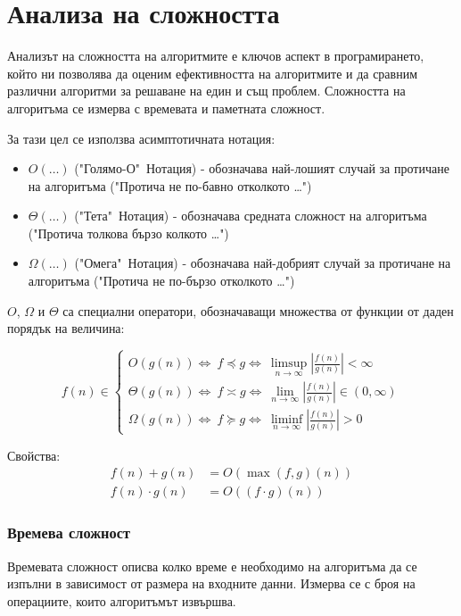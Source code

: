 \documentclass[oneside]{book}
\begin{document}
\section{Анализа на сложността}
Анализът на сложността на алгоритмите е ключов аспект в програмирането, който ни позволява да оценим ефективността на алгоритмите и да сравним различни алгоритми за решаване на един и същ проблем.
Сложността на алгоритъма се измерва с времевата и паметната сложност.

\pagebreak
За тази цел се използва асимптотичната нотация:
\begin{itemize}
    \item $O(\dots)$ ("Голямо-О"\ Нотация) - обозначава най-лошият случай за протичане на алгоритъма ("Протича не по-бавно отколкото \dots")
    \item $\Theta(\dots)$ ("Тета"\ Нотация) - обозначава средната сложност на алгоритъма ("Протича толкова бързо колкото \dots")
    \item $\Omega(\dots)$ ("Омега"\ Нотация) - обозначава най-добрият случай за протичане на алгоритъма ("Протича не по-бързо отколкото \dots")
\end{itemize}

$O$, $\Omega$ и $\Theta$ са специални оператори, обозначаващи множества от функции от даден порядък на величина:

\begin{equation*}
    f(n)\in
    \begin{cases}
        O(g(n)) \Leftrightarrow\ f \preceq g \Leftrightarrow\ \limsup_{n\to\infty} \left|\frac{f(n)}{g(n)}\right| < \infty\\
        \Theta(g(n)) \Leftrightarrow\ f \asymp g \Leftrightarrow\ \lim_{n\to\infty} \left|\frac{f(n)}{g(n)}\right| \in (0, \infty)\\
        \Omega(g(n)) \Leftrightarrow\ f \succeq g \Leftrightarrow\ \liminf_{n\to\infty} \left|\frac{f(n)}{g(n)}\right| > 0
    \end{cases}
\end{equation*}

Свойства:
\begin{align*}
    f(n) + g(n) &= O(\max(f,g)(n))\\
    f(n) \cdot g(n) &= O((f \cdot g)(n))
\end{align*}

\subsubsection{Времева сложност}
Времевата сложност описва колко време е необходимо на алгоритъма да се изпълни в зависимост от размера на входните данни. Измерва се с броя на операциите, които алгоритъмът извършва.
\end{document}
